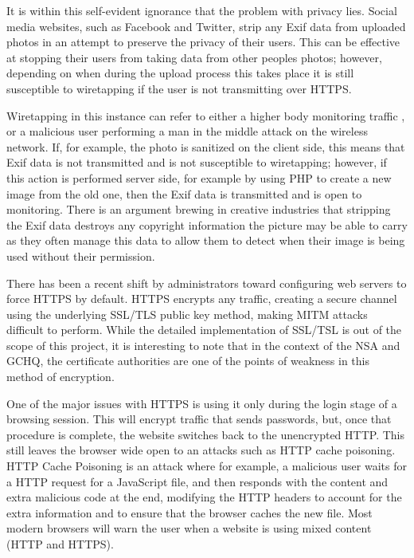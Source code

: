 It is within this self-evident ignorance that the problem with privacy lies. Social media websites, such as Facebook and Twitter, strip any Exif data \cite{intro:twitter_exif} from uploaded photos in an attempt to preserve the privacy of their users. This can be effective at stopping their users from taking data from other peoples photos; however, depending on when during the upload process this takes place it is still susceptible to wiretapping if the user is not transmitting over HTTPS. 

Wiretapping in this instance can refer to either a higher body monitoring traffic \cite{intro:room_641a}, or a malicious user performing a man in the middle attack on the wireless network. If, for example, the photo is sanitized on the client side, this means that Exif data is not transmitted and is not susceptible to wiretapping; however, if this action is performed server side, for example by using PHP to create a new image from the old one, then the Exif data is transmitted and is open to monitoring. There is an argument brewing in creative industries that stripping the Exif data destroys any copyright information the picture may be able to carry as they often manage this data to allow them to detect when their image is being used without their permission.

There has been a recent shift by administrators toward configuring web servers to force HTTPS by default. HTTPS encrypts any traffic, creating a secure channel using the underlying SSL/TLS public key method, making MITM attacks difficult to perform. While the detailed implementation of SSL/TSL is out of the scope of this project, it is interesting to note that in the context of the NSA and GCHQ, the certificate authorities are one of the points of weakness in this method of encryption. 

One of the major issues with HTTPS is using it only during the login stage of a browsing session. This will encrypt traffic that sends passwords, but, once that procedure is complete, the website switches back to the unencrypted HTTP. This still leaves the browser wide open to an attacks such as HTTP cache poisoning. HTTP Cache Poisoning is an attack where for example, a malicious user waits for a HTTP request for a JavaScript file, and then responds with the content and extra malicious code at the end, modifying the HTTP headers to account for the extra information and to ensure that the browser caches the new file. Most modern browsers will warn the user when a website is using mixed content (HTTP and HTTPS).

